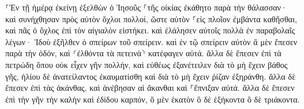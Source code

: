 \documentclass{openreader}
\begin{document}
⸀Ἐν τῇ ἡμέρᾳ ἐκείνῃ ἐξελθὼν ὁ Ἰησοῦς ⸀τῆς οἰκίας ἐκάθητο παρὰ τὴν θάλασσαν· 
καὶ συνήχθησαν πρὸς αὐτὸν ὄχλοι πολλοί, ὥστε αὐτὸν ⸀εἰς πλοῖον ἐμβάντα καθῆσθαι, καὶ πᾶς ὁ ὄχλος ἐπὶ τὸν αἰγιαλὸν εἱστήκει. 
καὶ ἐλάλησεν αὐτοῖς πολλὰ ἐν παραβολαῖς λέγων· Ἰδοὺ ἐξῆλθεν ὁ σπείρων τοῦ σπείρειν. 
καὶ ἐν τῷ σπείρειν αὐτὸν ἃ μὲν ἔπεσεν παρὰ τὴν ὁδόν, καὶ ⸂ἐλθόντα τὰ πετεινὰ⸃ κατέφαγεν αὐτά. 
ἄλλα δὲ ἔπεσεν ἐπὶ τὰ πετρώδη ὅπου οὐκ εἶχεν γῆν πολλήν, καὶ εὐθέως ἐξανέτειλεν διὰ τὸ μὴ ἔχειν βάθος γῆς, 
ἡλίου δὲ ἀνατείλαντος ἐκαυματίσθη καὶ διὰ τὸ μὴ ἔχειν ῥίζαν ἐξηράνθη. 
ἄλλα δὲ ἔπεσεν ἐπὶ τὰς ἀκάνθας, καὶ ἀνέβησαν αἱ ἄκανθαι καὶ ⸀ἔπνιξαν αὐτά. 
ἄλλα δὲ ἔπεσεν ἐπὶ τὴν γῆν τὴν καλὴν καὶ ἐδίδου καρπόν, ὃ μὲν ἑκατὸν ὃ δὲ ἑξήκοντα ὃ δὲ τριάκοντα. 
\end{document}
